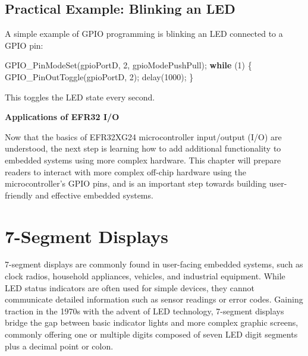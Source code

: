 \documentclass[
  9pt,
  letterpaper,
  abstract,
  titlepage]{scrbook}
\makeatletter
\newenvironment{Shaded}{\begin{snugshade}}{\end{snugshade}}
\newcommand{\ControlFlowTok}[1]{\textcolor[rgb]{0.00,0.23,0.31}{\textbf{#1}}}
\newcommand{\DecValTok}[1]{\textcolor[rgb]{0.68,0.00,0.00}{#1}}
\newcommand{\NormalTok}[1]{\textcolor[rgb]{0.00,0.23,0.31}{#1}}
\newcommand{\OperatorTok}[1]{\textcolor[rgb]{0.37,0.37,0.37}{#1}}
\renewcommand\chapter{\clearpage\global\@topnum\z@
\@afterindentfalse \secdef\@chapter\@schapter}
\newif\if@firstnumbered%
\newif\if@firstunnumbered%
\newcounter{lastRomanPage}
\let\old@chapter\chapter%
\renewcommand{\chapter}{%
  \@ifstar{\unnumbered@chapter}{\numbered@chapter}%
}
\newcommand{\numbered@chapter}[1]{%
  \if@firstnumbered%
    \cleardoublepage%
    \setcounter{lastRomanPage}{\value{page}}%
    \pagenumbering{arabic}%
    \@firstnumberedfalse%
  \else
    \setcounter{page}{\value{page}}%
  \fi
  \old@chapter{#1}%
}
\newcommand{\unnumbered@chapter}[1]{%
  \if@firstunnumbered%
    \clearpage
    \setcounter{lastRomanPage}{\value{page}}%
    \pagenumbering{roman}%
    \@firstunnumberedfalse%
  \fi
  \old@chapter*{#1}%
}
\makeatother
\begin{document}
\subsection{Practical Example: Blinking an
LED}\label{practical-example-blinking-an-led}

A simple example of GPIO programming is blinking an LED connected to a
GPIO pin:

\begin{Shaded}
\begin{Highlighting}[]
\NormalTok{GPIO\_PinModeSet}\OperatorTok{(}\NormalTok{gpioPortD}\OperatorTok{,} \DecValTok{2}\OperatorTok{,}\NormalTok{ gpioModePushPull}\OperatorTok{);}
\ControlFlowTok{while} \OperatorTok{(}\DecValTok{1}\OperatorTok{)} \OperatorTok{\{}
\NormalTok{    GPIO\_PinOutToggle}\OperatorTok{(}\NormalTok{gpioPortD}\OperatorTok{,} \DecValTok{2}\OperatorTok{);}
\NormalTok{    delay}\OperatorTok{(}\DecValTok{1000}\OperatorTok{);}
\OperatorTok{\}}
\end{Highlighting}
\end{Shaded}

This toggles the LED state every second.

\chapter{\texorpdfstring{\textbf{Applications of EFR32
I/O}}{Applications of EFR32 I/O}}\label{applications-of-efr32-io}

Now that the basics of EFR32XG24 microcontroller input/output (I/O) are
understood, the next step is learning how to add additional
functionality to embedded systems using more complex hardware. This
chapter will prepare readers to interact with more complex off-chip
hardware using the microcontroller's GPIO pins, and is an important step
towards building user-friendly and effective embedded systems.

\section{7-Segment Displays}\label{segment-displays}

7-segment displays are commonly found in user-facing embedded systems,
such as clock radios, household appliances, vehicles, and industrial
equipment. While LED status indicators are often used for simple
devices, they cannot communicate detailed information such as sensor
readings or error codes. Gaining traction in the 1970s with the advent
of LED technology, 7-segment displays bridge the gap between basic
indicator lights and more complex graphic screens, commonly offering one
or multiple digits composed of seven LED digit segments plus a decimal
point or colon.
\end{document}
